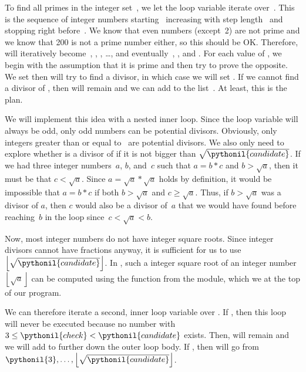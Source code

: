 %
\begin{sloppypar}%
To find all primes in the integer set~, we let the loop variable  iterate over~.
This is the sequence of integer numbers starting~ increasing with step length~ and stopping right before~.
We know that even numbers (except~2) are not prime and we know that 200 is not a prime number either, so this should be OK.
Therefore,  will iteratively become~, , , \dots, and eventually~, , and .
For each value of , we begin with the assumption that it is prime and then try to prove the opposite.
We set  then will try to find a divisor, in which case we will set .
If we cannot find a divisor of , then  will remain  and we can add  to the list~.
At least, this is the plan.%
\end{sloppypar}%
%
We will implement this idea with a nested inner loop.
Since the loop variable  will always be odd, only odd numbers can be potential divisors.
Obviously, only integers greater than or equal to~ are potential divisors.
We also only need to explore whether  is a divisor of  if it is not bigger than $\sqrt{\pythonil{candidate}}$.
If we had three integer numbers~$a$, $b$, and~$c$ such that $a=b*c$ and $b>\sqrt{a}$, then it must be that $c<\sqrt{a}$.
Since $a=\sqrt{a}*\sqrt{a}$ holds by definition, it would be impossible that $a=b*c$ if both $b>\sqrt{a}$ and $c\geq\sqrt{a}$.
Thus, if $b>\sqrt{a}$ was a divisor of $a$, then $c$ would also be a divisor of~$a$ that we would have found before reaching~$b$ in the loop since~$c<\sqrt{a}<b$.

Now, most integer numbers do not have integer square roots.
Since integer divisors cannot have fractions anyway, it is sufficient for us to use $\left\lfloor\sqrt{\pythonil{candidate}}\right\rfloor$.
In \python, such a  integer square root of an integer number~$\left\lfloor\sqrt{a}\right\rfloor$ can be computed using the  function from the  module, which we  at the top of our program.

We can therefore iterate a second, inner loop variable  over .
If , then this loop will never be executed because no number  with $3\leq\pythonil{check}<\pythonil{candidate}$ exists.
Then,  will remain  and we will add  to  further down the outer loop body.
If , then  will go from $\pythonil{3}, \dots, \left\lfloor\sqrt{\pythonil{candidate}}\right\rfloor$.

